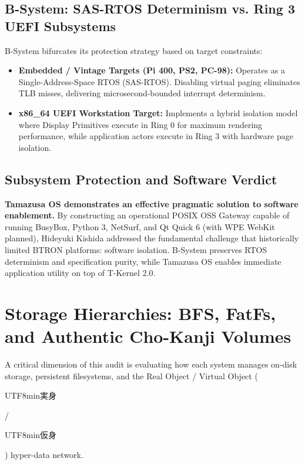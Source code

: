 \documentclass[10pt,journal,compsoc,twocolumn]{article}
\newcommand{\ja}[1]{\begin{CJK*}{UTF8}{min}#1\end{CJK*}}
\begin{document}
\subsection{B-System: SAS-RTOS Determinism vs. Ring 3 UEFI Subsystems}
B-System bifurcates its protection strategy based on target constraints:
\begin{itemize}[leftmargin=*]
    \item \textbf{Embedded / Vintage Targets (Pi 400, PS2, PC-98):} Operates as a Single-Address-Space RTOS (SAS-RTOS). Disabling virtual paging eliminates TLB misses, delivering microsecond-bounded interrupt determinism.
    \item \textbf{x86\_64 UEFI Workstation Target:} Implements a hybrid isolation model where Display Primitives execute in Ring 0 for maximum rendering performance, while application actors execute in Ring 3 with hardware page isolation.
\end{itemize}

\subsection{Subsystem Protection and Software Verdict}
\textbf{Tamazusa OS demonstrates an effective pragmatic solution to software enablement.} By constructing an operational POSIX OSS Gateway capable of running BusyBox, Python 3, NetSurf, and Qt Quick 6 (with WPE WebKit planned), Hideyuki Kishida addressed the fundamental challenge that historically limited BTRON platforms: software isolation. B-System preserves RTOS determinism and specification purity, while Tamazusa OS enables immediate application utility on top of T-Kernel 2.0.

\section{Storage Hierarchies: BFS, FatFs, and Authentic Cho-Kanji Volumes}
\label{sec:fs}

A critical dimension of this audit is evaluating how each system manages on-disk storage, persistent filesystems, and the Real Object / Virtual Object (\ja{実身}/\ja{仮身}) hyper-data network.
\end{document}
